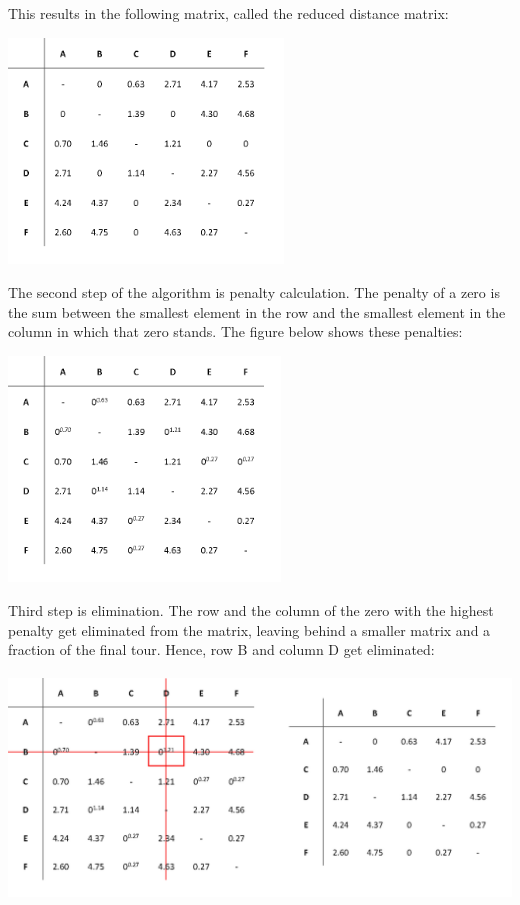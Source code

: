 \noindent
This results in the following matrix, called the reduced distance matrix:

\begin{center}
	\includegraphics[height=6cm]{1red}
\end{center}
	
\noindent
The second step of the algorithm is penalty calculation. The penalty of a zero is the sum between the smallest element in the row and the smallest element in the column in which that zero stands. The figure below shows these penalties:

\begin{center}
	\includegraphics[height=6cm]{1pen}
\end{center}

\noindent
Third step is elimination. The row and the column of the zero with the highest penalty get eliminated from the matrix, leaving behind a smaller matrix and a fraction of the final tour. Hence, row B and column D get eliminated:

\begin{center}
	\includegraphics[height=6cm]{1elim2} 
\end{center}
	
